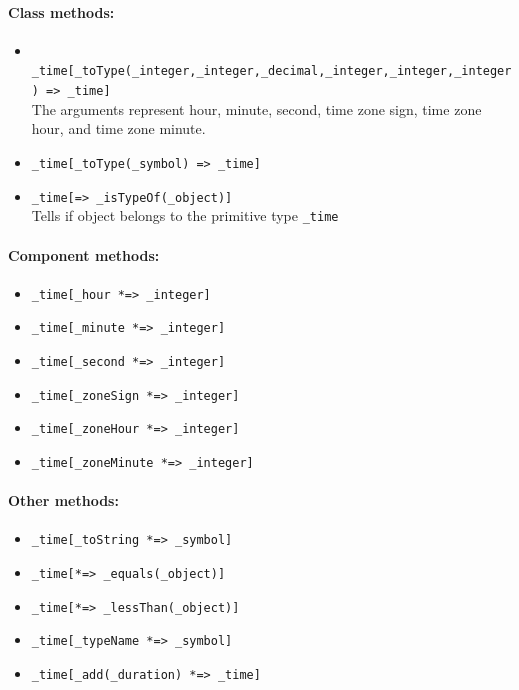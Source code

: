 \documentclass[11pt]{article}
\begin{document}
\paragraph{Class methods:}
\begin{itemize}
\item {\tt
    \_time[\_toType(\_integer,\_integer,\_decimal,\_integer,\_integer,\_integer)
    => \_time]}
  \\
  The arguments represent hour, minute, second, time zone sign, time
  zone hour, and time zone minute.
  \item {\tt \_time[\_toType(\_symbol) => \_time]}
\item {\tt \_time[=> \_isTypeOf(\_object)]}
  \\
  Tells if object belongs to the primitive type {\tt \_time}  
\end{itemize}

\paragraph{Component methods:}
\begin{itemize}
\item {\tt \_time[\_hour *=> \_integer]}
\item {\tt \_time[\_minute *=> \_integer]}
\item {\tt \_time[\_second *=> \_integer]}
\item {\tt \_time[\_zoneSign *=> \_integer]}
\item {\tt \_time[\_zoneHour *=> \_integer]}
\item {\tt \_time[\_zoneMinute *=> \_integer] }
\end{itemize}

\paragraph{Other methods:}
\begin{itemize}
\item {\tt \_time[\_toString *=> \_symbol]}
\item {\tt \_time[*=> \_equals(\_object)]}
\item {\tt \_time[*=> \_lessThan(\_object)]}
\item {\tt \_time[\_typeName *=> \_symbol]}
\item {\tt \_time[\_add(\_duration) *=> \_time] }
\end{itemize}
\end{document}
